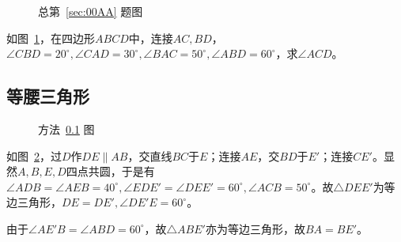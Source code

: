 

\begin{figure}[htbp]
  \centering {}
  \caption{总第~\ref{sec:00AA} 题图} \label{fig:00AA}
\end{figure}

如图~\ref{fig:00AA}，在四边形$ABCD$中，连接$AC, BD$，$\angle CBD = 20^\circ, \angle CAD = 30^\circ, \angle BAC = 50^\circ, \angle ABD = 60^\circ$，求$\angle ACD$。


\subsection{等腰三角形} \label{subsec:00AA-eq}

\begin{figure}[htbp]
  \centering {}
  \caption{方法~\ref{subsec:00AA-eq} 图} \label{fig:00AA-eq}
\end{figure}

如图~\ref{fig:00AA-eq}，过$D$作$DE \parallel AB$，交直线$BC$于$E$；连接$AE$，交$BD$于$E'$；连接$CE'$。显然$A, B, E, D$四点共圆，于是有$\angle ADB = \angle AEB = 40^\circ, \angle EDE' = \angle DEE' = 60^\circ, \angle ACB = 50^\circ$。故$\triangle DEE'$为等边三角形，$DE = DE', \angle DE'E = 60^\circ$。

由于$\angle AE'B = \angle ABD = 60^\circ$，故$\triangle ABE'$亦为等边三角形，故$BA = BE'$。

